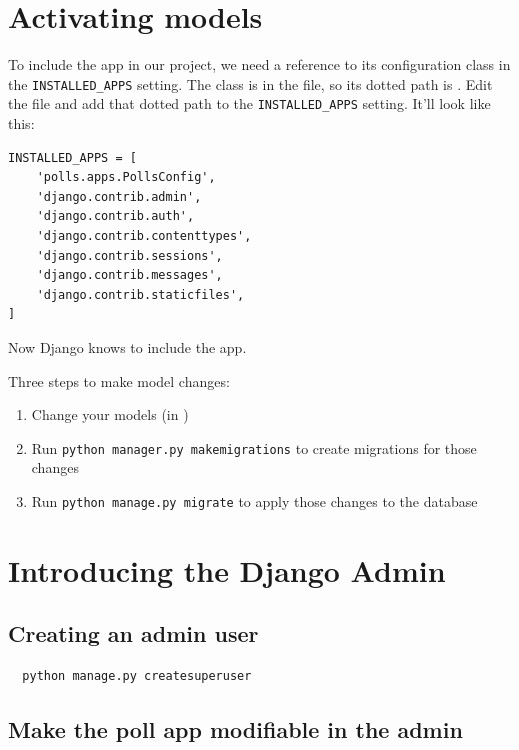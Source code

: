 \section{Activating models}

To include the app in our project, we need a reference to its configuration class in the \verb|INSTALLED_APPS| setting.
The  class is in the  file, so its dotted path is .
Edit the  file and add that dotted path to the \verb|INSTALLED_APPS| setting.
It’ll look like this:
\begin{tcolorbox}
\begin{verbatim}
INSTALLED_APPS = [
    'polls.apps.PollsConfig',
    'django.contrib.admin',
    'django.contrib.auth',
    'django.contrib.contenttypes',
    'django.contrib.sessions',
    'django.contrib.messages',
    'django.contrib.staticfiles',
]
\end{verbatim}
\end{tcolorbox}

Now Django knows to include the  app.


Three steps to make model changes:
\begin{enumerate}
\item Change your models (in )
\item Run \verb|python manager.py makemigrations| to create migrations for those changes
\item Run \verb|python manage.py migrate| to apply those changes to the database
\end{enumerate}


\section{Introducing the Django Admin}

\subsection{Creating an admin user}

\lstset{language=Sh}
\begin{lstlisting}
  python manage.py createsuperuser
\end{lstlisting}



\subsection{Make the poll app modifiable in the admin}

